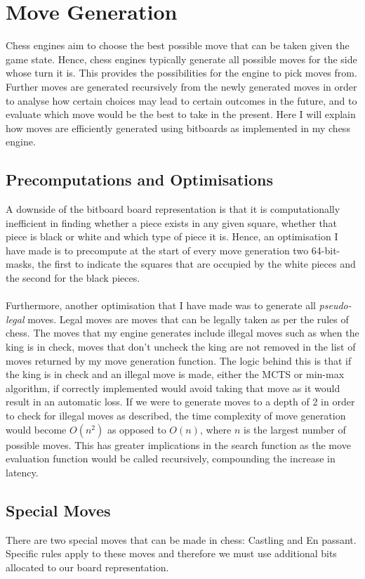 \chapter{Move Generation}
Chess engines aim to choose the best possible move that can be taken given the game state. Hence, chess engines typically generate all possible moves for the side whose turn it is. This provides the possibilities for the engine to pick moves from. Further moves are generated recursively from the newly generated moves in order to analyse how certain choices may lead to certain outcomes in the future, and to evaluate which move would be the best to take in the present. Here I will explain how moves are efficiently generated using bitboards as implemented in my chess engine.
\section{Precomputations and Optimisations}
A downside of the bitboard board representation is that it is computationally inefficient in finding whether a piece exists in any given square, whether that piece is black or white and which type of piece it is. Hence, an optimisation I have made is to precompute at the start of every move generation two 64-bit-masks, the first to indicate the squares that are occupied by the white pieces and the second for the black pieces.\\\\
Furthermore, another optimisation that I have made was to generate all \textit{pseudo-legal} moves. Legal moves are moves that can be legally taken as per the rules of chess. The moves that my engine generates include illegal moves such as when the king is in check, moves that don't uncheck the king are not removed in the list of moves returned by my move generation function. The logic behind this is that if the king is in check and an illegal move is made, either the MCTS or min-max algorithm, if correctly implemented would avoid taking that move as it would result in an automatic loss. If we were to generate moves to a depth of 2 in order to check for illegal moves as described, the time complexity of move generation would become $O(n^2)$ as opposed to $O(n)$, where $n$ is the largest number of possible moves. This has greater implications in the search function as the move evaluation function would be called recursively, compounding the increase in latency.
\pagebreak
\section{Special Moves}
There are two special moves that can be made in chess: Castling and En passant. Specific rules apply to these moves and therefore we must use additional bits allocated to our board representation.
